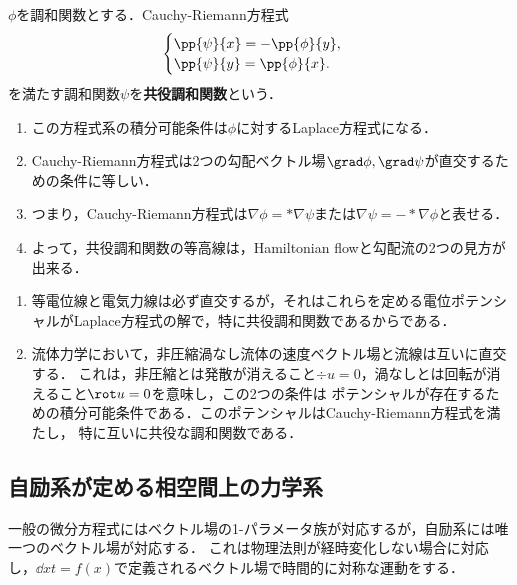 \documentclass[uplatex,dvipdfmx]{jsreport}
\begin{document}
\begin{definition}
    $\phi$を調和関数とする．Cauchy-Riemann方程式
    \[\begin{cases}
        \pp{\psi}{x}=-\pp{\phi}{y},\\
        \pp{\psi}{y}=\pp{\phi}{x}.
    \end{cases}\]
    を満たす調和関数$\psi$を\textbf{共役調和関数}という．
\end{definition}
\begin{remarks}\mbox{}\label{remarks-dual-harmonic-function}
    \begin{enumerate}
        \item この方程式系の積分可能条件は$\phi$に対するLaplace方程式になる．
        \item Cauchy-Riemann方程式は2つの勾配ベクトル場$\grad\phi,\grad\psi$が直交するための条件に等しい．
        \item つまり，Cauchy-Riemann方程式は$\nabla\phi=*\nabla\psi$または$\nabla\psi=-*\nabla\phi$と表せる．
        \item よって，共役調和関数の等高線は，Hamiltonian flowと勾配流の2つの見方が出来る．
    \end{enumerate}
\end{remarks}
\begin{example}\mbox{}
    \begin{enumerate}
        \item 等電位線と電気力線は必ず直交するが，それはこれらを定める電位ポテンシャルがLaplace方程式の解で，特に共役調和関数であるからである．
        \item 流体力学において，非圧縮渦なし流体の速度ベクトル場と流線は互いに直交する．
        これは，非圧縮とは発散が消えること$\div u=0$，渦なしとは回転が消えること$\rot u=0$を意味し，この2つの条件は
        ポテンシャルが存在するための積分可能条件である．このポテンシャルはCauchy-Riemann方程式を満たし，
        特に互いに共役な調和関数である．
    \end{enumerate}
\end{example}

\subsection{自励系が定める相空間上の力学系}

\begin{tcolorbox}[colframe=ForestGreen, colback=ForestGreen!10!white,breakable,colbacktitle=ForestGreen!40!white,coltitle=black,fonttitle=\bfseries\sffamily,
title=]
    一般の微分方程式にはベクトル場の1-パラメータ族が対応するが，自励系には唯一つのベクトル場が対応する．
    これは物理法則が経時変化しない場合に対応し，$\dd{x}{t}=f(x)$で定義されるベクトル場で時間的に対称な運動をする．
\end{tcolorbox}
\end{document}

